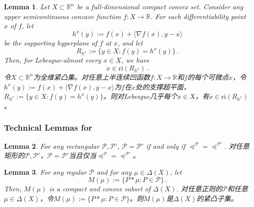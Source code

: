 \documentclass[12pt,letterpaper]{article}
\newenvironment{original}{\color{black}}{}
\newenvironment{translation}{\color{blue}}{}
\theoremstyle{plain}
\newtheorem{lemma}{Lemma}
\theoremstyle{definition}
\theoremstyle{remark}
\newcommand{\Pc}{\mathcal{P}}
\newcommand{\R}{\mathds{R}}
\theoremstyle{definition}
\begin{document}
\begin{lemma}\label{lem:ri-contact-ae}
\begin{original}
Let $X\subset \mathbb{R}^n$ be a full-dimensional compact convex set. Consider any upper semicontinuous concave function $f:X \to \R$. For each differentiability point $x$ of $f$, let
\[
h^x(y):=f(x)+\langle \nabla f(x),  y-x \rangle
\]
be the supporting hyperplane of $f$ at $x$, and let
\[
R_{h^x}:=\Big\{y\in X:f(y)=h^x(y)\Big\}\,.
\]
Then, for Lebesgue-almost every $x \in X$, we have
\[
x\in \mathrm{ri}(R_{h^x})\,.
\]
\end{original}
\begin{translation}
令$X\subset \mathbb{R}^n$为全维紧凸集。对任意上半连续凹函数$f:X \to \R$和$f$的每个可微点$x$，令$h^x(y):=f(x)+\langle \nabla f(x), y-x \rangle$为$f$在$x$处的支撑超平面，$R_{h^x}:=\{y\in X:f(y)=h^x(y)\}$。则对Lebesgue几乎每个$x \in X$，有$x\in \mathrm{ri}(R_{h^x})$。
\end{translation}
\end{lemma}

\subsubsection{Technical Lemmas for \texorpdfstring{}{Section 4}}
\begin{lemma}\label{lem:rectangle}
\begin{original}
For any rectangular $\Pc,\Pc'$, $\Pc=\Pc'$ if and only if $\preceq^{\Pc}=\preceq^{\Pc'}$.
\end{original}
\begin{translation}
对任意矩形的$\Pc,\Pc'$，$\Pc=\Pc'$当且仅当$\preceq^{\Pc}=\preceq^{\Pc'}$。
\end{translation}
\end{lemma}

\begin{lemma}\label{lem:compactm}
\begin{original}
For any regular $\Pc$ and for any $\mu \in \Delta(X)$, let
\[
M(\mu):=\{P*\mu: P \in \Pc\}\,.
\]
Then, $M(\mu)$ is a compact and convex subset of $\Delta(X)$.
\end{original}
\begin{translation}
对任意正则的$\Pc$和任意$\mu \in \Delta(X)$，令$M(\mu):=\{P*\mu: P \in \Pc\}$。则$M(\mu)$是$\Delta(X)$的紧凸子集。
\end{translation}
\end{lemma}
\end{document}

